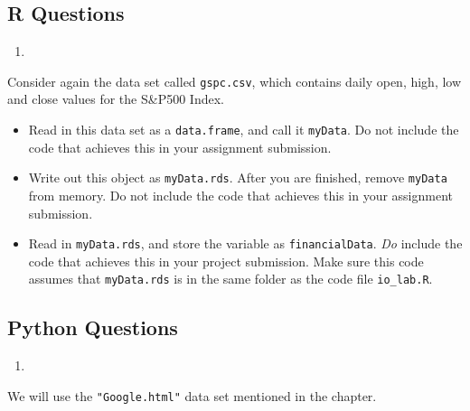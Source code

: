 \documentclass[
  12pt,
  krantz2]{krantz}
\providecommand{\tightlist}{%
  \setlength{\itemsep}{0pt}\setlength{\parskip}{0pt}}
\begin{document}
\hypertarget{r-questions-7}{%
\subsection{R Questions}\label{r-questions-7}}

\begin{enumerate}
\def\labelenumi{\arabic{enumi}.}
\tightlist
\item
\end{enumerate}

Consider again the data set called \texttt{gspc.csv}, which contains daily open, high, low and close values for the S\&P500 Index.

\begin{itemize}
\tightlist
\item
  Read in this data set as a \texttt{data.frame}, and call it \texttt{myData}. Do not include the code that achieves this in your assignment submission.
\item
  Write out this object as \texttt{myData.rds}. After you are finished, remove \texttt{myData} from memory. Do not include the code that achieves this in your assignment submission.
\item
  Read in \texttt{myData.rds}, and store the variable as \texttt{financialData}. \emph{Do} include the code that achieves this in your project submission. Make sure this code assumes that \texttt{myData.rds} is in the same folder as the code file \texttt{io\_lab.R}.
\end{itemize}

\hypertarget{python-questions-7}{%
\subsection{Python Questions}\label{python-questions-7}}

\begin{enumerate}
\def\labelenumi{\arabic{enumi}.}
\tightlist
\item
\end{enumerate}

We will use the \texttt{"Google.html"} data set mentioned in the chapter.
\end{document}
